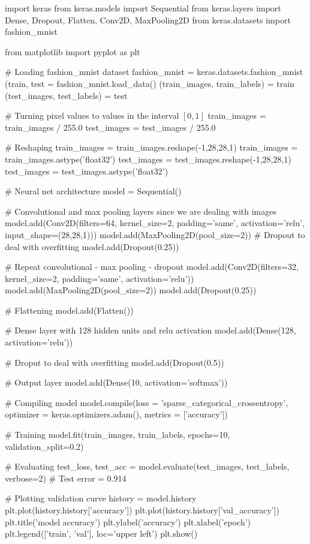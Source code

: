 \begin{python}
import keras
from keras.models import Sequential
from keras.layers import Dense, Dropout, Flatten, Conv2D, MaxPooling2D
from keras.datasets import fashion_mnist

from matplotlib import pyplot as plt

# Loading fashion_mnist dataset
fashion_mnist = keras.datasets.fashion_mnist
(train, test = fashion_mnist.load_data()
(train_images, train_labels) = train
(test_images, test_labels) = test

# Turning pixel values to values in the interval $[0,1]$
train_images = train_images / 255.0
test_images = test_images / 255.0

# Reshaping
train_images = train_images.reshape(-1,28,28,1)
train_images = train_images.astype('float32')
test_images = test_images.reshape(-1,28,28,1)
test_images = test_images.astype('float32')

# Neural net architecture
model = Sequential()

# Convolutional and max pooling layers since we are dealing with images
model.add(Conv2D(filters=64, kernel_size=2,
                 padding='same', activation='relu',
                 input_shape=(28,28,1)))
model.add(MaxPooling2D(pool_size=2))
# Dropout to deal with overfitting
model.add(Dropout(0.25))

# Repeat convolutional - max pooling - dropout
model.add(Conv2D(filters=32, kernel_size=2,
                 padding='same', activation='relu'))
model.add(MaxPooling2D(pool_size=2))
model.add(Dropout(0.25))

# Flattening
model.add(Flatten())

# Dense layer with 128 hidden units and relu activation
model.add(Dense(128, activation='relu'))

# Droput to deal with overfitting
model.add(Dropout(0.5))

# Output layer
model.add(Dense(10, activation='softmax'))

# Compiling model
model.compile(loss = 'sparse_categorical_crossentropy',
              optimizer = keras.optimizers.adam(),
              metrics = ['accuracy'])

# Training
model.fit(train_images, train_labels, epochs=10, validation_split=0.2)

# Evaluating
test_loss, test_acc = model.evaluate(test_images,  test_labels, verbose=2)
# Test error = 0.914

# Plotting validation curve
history = model.history
plt.plot(history.history['accuracy'])
plt.plot(history.history['val_accuracy'])
plt.title('model accuracy')
plt.ylabel('accuracy')
plt.xlabel('epoch')
plt.legend(['train', 'val'], loc='upper left')
plt.show()
\end{python}

